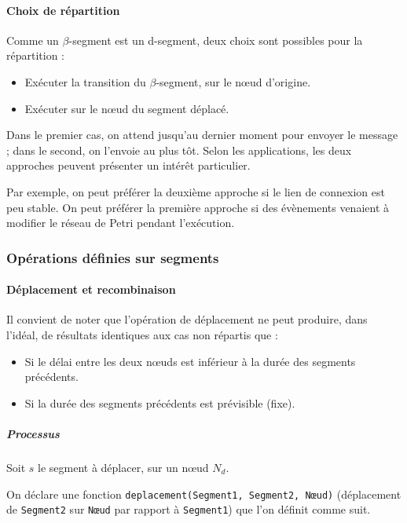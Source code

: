 \paragraph{Choix de répartition}
Comme un $\beta$-segment est un d-segment, deux choix sont possibles pour la répartition : 

\begin{itemize}
	\item Exécuter la transition du $\beta$-segment, sur le nœud d'origine.
	\item Exécuter sur le nœud du segment déplacé.
\end{itemize}

Dans le premier cas, on attend jusqu'au dernier moment pour envoyer le message ; dans le second, on l'envoie au plus tôt. Selon les applications, les deux approches peuvent présenter un intérêt particulier.

Par exemple, on peut préférer la deuxième approche si le lien de connexion est peu stable. On peut préférer la première approche si des évènements venaient à modifier le réseau de Petri pendant l'exécution.

\subsubsection{Opérations définies sur segments}
\paragraph{Déplacement et recombinaison}

Il convient de noter que l'opération de déplacement ne peut produire, dans l'idéal, de résultats identiques aux cas non répartis que : 
\begin{itemize}
\item Si le délai entre les deux nœuds est inférieur à la durée des segments précédents.
\item Si la durée des segments précédents est prévisible (fixe).
\end{itemize} 

\subparagraph{Processus}
\label{section.processusDeplacement}
Soit $s$ le segment à déplacer, sur un nœud $N_d$.

On déclare une fonction \texttt{deplacement(Segment1, Segment2, Nœud)} (déplacement de \texttt{Segment2} sur \texttt{Nœud} par rapport à \texttt{Segment1}) que l'on définit comme suit.

